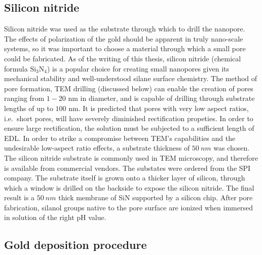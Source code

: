 		\subsection{Silicon nitride}
			
			Silicon nitride was used as the substrate through which to drill the nanopore. The effects of polarization of the gold should be apparent in truly nano-scale systems, so it was important to choose a material through which a small pore could be fabricated. As of the writing of this thesis, silicon nitride (chemical formula $\mathrm{Si_{3}N_{4}}$) is a popular choice for creating small nanopores given its mechanical stability and well-understood silane surface chemistry. The method of pore formation, TEM drilling (discussed below) can enable the creation of pores ranging from $1-20$ nm in diameter, and is capable of drilling through substrate lengths of up to $100$ nm. It is predicted that pores with very low aspect ratios, i.e.~short pores, will have severely diminished rectification propeties. In order to ensure large rectification, the solution must be subjected to a sufficient length of EDL. In order to strike a compromise between TEM's capabilities and the undesirable low-aspect ratio effects, a substrate thickness of $\SI{50}{nm}$ was chosen. The silicon nitride substrate is commonly used in TEM microscopy, and therefore is available from commercial vendors. The substates were ordered from the SPI company. The substrate itself is grown onto a thicker layer of silicon, through which a window is drilled on the backside to expose the silicon nitride. The final result is a $\SI{50}{nm}$ thick membrane of SiN supported by a silicon chip. After pore fabrication, silanol groups native to the pore surface are ionized when immersed in solution of the right pH value.
			
		\subsection{Gold deposition procedure}
			
